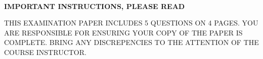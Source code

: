 \documentclass{exam}
\begin{document}
\begin{center}
 \\
\vspace{2em}
\textbf{IMPORTANT INSTRUCTIONS, PLEASE READ} \\
\end{center}

THIS EXAMINATION PAPER INCLUDES 5 QUESTIONS ON 4 PAGES.  YOU ARE RESPONSIBLE FOR ENSURING YOUR COPY OF THE PAPER IS COMPLETE.  BRING ANY DISCREPENCIES TO THE ATTENTION OF THE COURSE INSTRUCTOR.  
\end{document}
